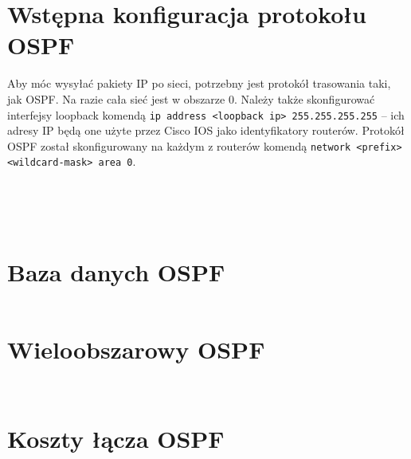 \documentclass[a4paper,12pt,notitlepage]{article}
\begin{document}
\section{Wstępna konfiguracja protokołu OSPF}

Aby móc wysyłać pakiety IP po sieci, potrzebny jest protokół trasowania taki, jak OSPF. Na razie cała sieć jest w obszarze 0. Należy także skonfigurować interfejsy loopback komendą \texttt{ip address <loopback ip> 255.255.255.255} -- ich adresy IP będą one użyte przez Cisco IOS jako identyfikatory routerów. Protokół OSPF został skonfigurowany na każdym z routerów komendą \texttt{network <prefix> <wildcard-mask> area 0}.

\inputminted[label=Router R1, firstline=228, lastline=279]{text}{R1.txt}
\inputminted[label=Router R2, firstline=366, lastline=422]{text}{R2_1.txt}
\inputminted[label=Router R3, firstline=286, lastline=341]{text}{R3.txt}
\inputminted[label=Router R4, firstline=269, lastline=324]{text}{R4.txt}
\inputminted[label=Router R5, firstline=285, lastline=339]{text}{R5.txt}

\section{Baza danych OSPF}

\inputminted[label=Router R5, firstline=366, lastline=595]{text}{R5.txt}

\section{Wieloobszarowy OSPF}

\inputminted[label=Router R1, firstline=309, lastline=390]{text}{R1.txt}
\inputminted[label=Router R5, firstline=597, lastline=680]{text}{R5.txt}

\section{Koszty łącza OSPF}

\inputminted[label=Router R4 - \#ping 192.168.11.1, firstline=377, lastline=379]{text}{R4.txt}
\inputminted[label=Router R4 - \#traceroute 192.168.11.1, firstline=394, lastline=397]{text}{R4.txt}

\inputminted[label=Router R2 - koszty łączy, firstline=247, lastline=251]{text}{R2.txt}

\inputminted[label=Router R2 - koszty łączy po zmianie, firstline=325, lastline=372]{text}{R2.txt}
\end{document}
